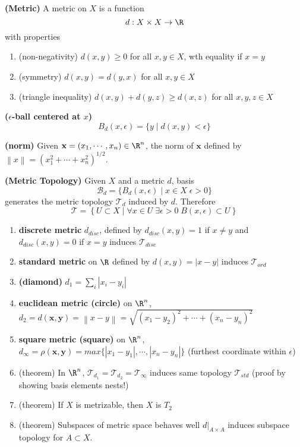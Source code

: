 \documentclass[10.5pt]{article}
\newcommand{\calB}{\mathcal{B}}
\newcommand{\calT}{\mathcal{T}}
\newcommand{\bx}{\mathbf{x}}
\newcommand{\by}{\mathbf{y}}
\renewcommand{\norm}[1]{\left\lVert#1\right\rVert}
\begin{document}
\begin{defn*}
    \textbf{(Metric)} A metric on $X$ is a function
    \[
        d: X\times X \to \R    
    \]
    with properties
    \begin{enumerate}
        \item (non-negativity) $d(x,y)\geq 0$ for all $x,y\in X$, wth equality if $x=y$
        \item (symmetry) $d(x,y) = d(y,x)$ for all $x,y\in X$
        \item (triangle inequality) $d(x,y) + d(y,z) \geq d(x,z)$ for all $x,y,z\in X$
    \end{enumerate}
\end{defn*}

\begin{defn*}
    \textbf{($\epsilon$-ball centered at $x$)}
    \[
        B_d(x, \epsilon) = \{y \mid d(x,y) < \epsilon\}
    \]
\end{defn*}

\begin{defn*}
    \textbf{(norm)} Given $\bx = (x_1,\cdots, x_n)\in \R^n$, the norm of $\bx$ defined by $\norm{x} = (x_1^2 + \cdots + x_n^2)^{1/2}$.
\end{defn*}

\begin{defn*}
    \textbf{(Metric Topology)}
    Given $X$ and a metric $d$, basis 
    \[
        \calB_{d} = 
        \{
            B_d(x,\epsilon) \mid x\in X \; \epsilon > 0
        \}
    \]
    generates the metric topology $\calT_d$ induced by $d$. Therefore 
    \[
        \calT =
        \left\{
            U\subset X \mid \forall x\in U \; \exists \epsilon > 0 \; B(x,\epsilon) \subset U
        \right\}
    \]
    \begin{enumerate}
        \item \textbf{discrete metric} $d_{disc}$, defined by $d_{disc}(x,y)=1$ if $x\neq y$ and $d_{disc}(x,y)=0$ if $x=y$ induces $\calT_{disc}$
        \item \textbf{standard metric} on $\R$ defined by $d(x,y) = |x-y|$ induces $\calT_{ord}$
        \item \textbf{(diamond)} $d_1 = \textstyle \sum_i |x_i - y_i|$
        \item \textbf{euclidean metric (circle)} on $\R^n$, $d_2 = d(\bx, \by) = \norm{x-y} = \sqrt{(x_1-y_2)^2 + \cdots + (x_n - y_n)^2}    $
        \item \textbf{square metric (square)} on $\R^n$, $d_{\infty} = \rho(\bx, \by) = max \{ |x_1 - y_1| ,\cdots , |x_n - y_n| \}$ (furthest coordinate within $\epsilon$)
        \item (theorem) In $\R^n$, $\calT_{d_1} = \calT_{d_2} = \calT_{\infty}$ induces same topology $\calT_{std}$ (proof by showing basis elements nests!)
        \item (theorem) If $X$ is metrizable, then $X$ is $T_2$
        \item (theorem) Subspaces of metric space behaves well $d|_{A\times A}$ induces subspace topology for $A\subset X$.
    \end{enumerate}
\end{defn*}
\end{document}
